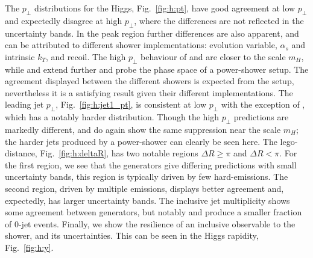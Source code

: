 The $p_\perp$ distributions for the Higgs, Fig.~\ref{fig:h:pt}, have good
agreement at low $p_\perp$ and expectedly disagree at high $p_\perp$, where
the differences are not reflected in the uncertainty bands. In the peak region
further differences are also apparent, and can be attributed to different
shower implementations: evolution variable, $\alpha_s$ and intrinsic $k_T$,
and recoil. The high $p_\perp$ behaviour of \Herwig and \Sherpa \CSS are
closer to the scale $m_H$, while \Pythia and \Sherpa \Dire extend further and
probe the phase space of a power-shower setup. The agreement displayed between
the different \Herwig showers is expected from the setup, nevertheless it is a
satisfying result given their different implementations.  The leading jet
$p_\perp$, Fig.~\ref{fig:h:jet1_pt}, is consistent at low $p_\perp$ with the
exception of \Pythia, which has a notably harder distribution. Though the high
$p_\perp$ predictions are markedly different, \Herwig and \Sherpa \CSS do
again show the same suppression near the scale $m_H$; the harder jets produced
by a power-shower can clearly be seen here.  The lego-distance,
Fig.~\ref{fig:h:deltaR}, has two notable regions $\Delta R \geq\pi$ and
$\Delta R < \pi$. For the first region, we see that the generators give
differing predictions with small uncertainty bands, this region is typically
driven by few hard-emissions. The second region, driven by multiple emissions,
displays better agreement and, expectedly, has larger uncertainty bands.  The
inclusive jet multiplicity shows some agreement between generators, but
notably \Sherpa \CSS and \Pythia produce a smaller fraction of $0$-jet
events. Finally, we show the resilience of an inclusive observable to the
shower, and its uncertainties. This can be seen in the Higgs rapidity,
Fig.~\ref{fig:h:y}.

